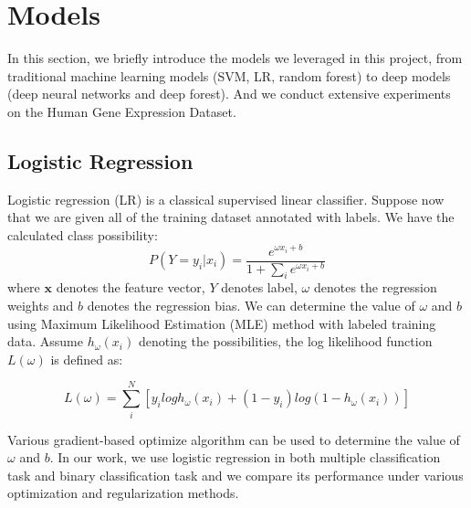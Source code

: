 \documentclass[sigconf]{acmart}
\begin{document}
	
	
	
	
	\maketitle
	
	\section{Models}
	In this section, we briefly introduce the models we leveraged in this project, from traditional machine learning models (SVM, LR, random forest) to deep models (deep neural networks and deep forest). And we conduct extensive experiments on the Human Gene Expression Dataset.
	
	
	\subsection{Logistic Regression}
	Logistic regression (LR) \cite{hosmer2013applied} is a  classical  supervised linear classifier.
	Suppose now that we are given all of the training dataset annotated with labels. We have the calculated class possibility:
	\begin{equation}
	P(Y=y_i|x_i)=\frac{e^{\omega x_i +b}}{1+\sum_i e^{\omega x_i +b}} 
	\label{lr_1}
	\end{equation}
	where $\mathbf{x}$ denotes the feature vector, $Y$ denotes label, $\omega$ denotes the regression weights and $b$ denotes the regression bias. We can determine the value of $\omega$ and $b$ using Maximum Likelihood Estimation (MLE) method with labeled training data. Assume $h_\omega(x_i)$ denoting the possibilities, the log likelihood function $L(\omega)$ is defined as:
	
	\begin{centering}
		\begin{equation}
		L(\omega)=\sum^N_i[y_i logh_\omega(x_i)+(1-y_i) log(1-h_\omega(x_i))]
		\label{lr_2}
		\end{equation}
		
	\end{centering}
	
	Various gradient-based optimize algorithm can be used to determine the value of $\omega$ and $b$. In our work, we use logistic regression in both multiple classification task and binary classification task and we compare its performance under various optimization and regularization methods.
	
\end{document}
